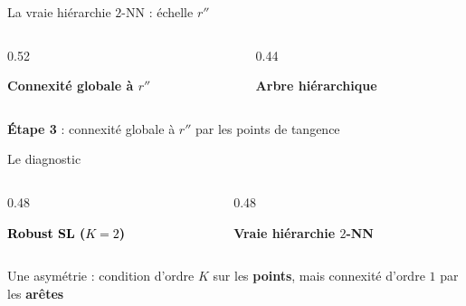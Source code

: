 \documentclass[A4,svgnames,9pt,aspectratio=169]{beamer}
\begin{document}
\begin{frame}{La vraie hiérarchie $2$-NN : échelle $r''$}
    \begin{columns}[c, onlytextwidth]
        \begin{column}{0.52\textwidth}
            \begin{center}
                \textbf{Connexité globale à $r''$}

                \vspace{0.4cm}
                
            \end{center}
        \end{column}

        \begin{column}{0.44\textwidth}
            \begin{center}
                \textcolor{inria-rouge}{\textbf{Arbre hiérarchique}}

                \vspace{0.4cm}
                
            \end{center}
        \end{column}
    \end{columns}
    \vspace{0.3cm}
    \begin{center}
        \small \textbf{Étape 3} : connexité globale à $r''$ par les points de tangence
    \end{center}
\end{frame}

\begin{frame}{Le diagnostic}
    \begin{columns}[c, onlytextwidth]
        \begin{column}{0.48\textwidth}
            \begin{center}
                \textcolor{black}{\textbf{Robust SL ($K=2$)}}

                \vspace{0.4cm}
                
            \end{center}
        \end{column}

        \begin{column}{0.48\textwidth}
            \begin{center}
                \textcolor{inria-rouge}{\textbf{Vraie hiérarchie $2$-NN}}

                \vspace{0.4cm}
                
            \end{center}
        \end{column}
    \end{columns}
    \vspace{0.25cm}
    \begin{center}
        \normalsize Une asymétrie : condition d'ordre $K$ sur les \textbf{points}, mais connexité d'ordre $1$ par les \textbf{arêtes}
    \end{center}
\end{frame}
\end{document}
